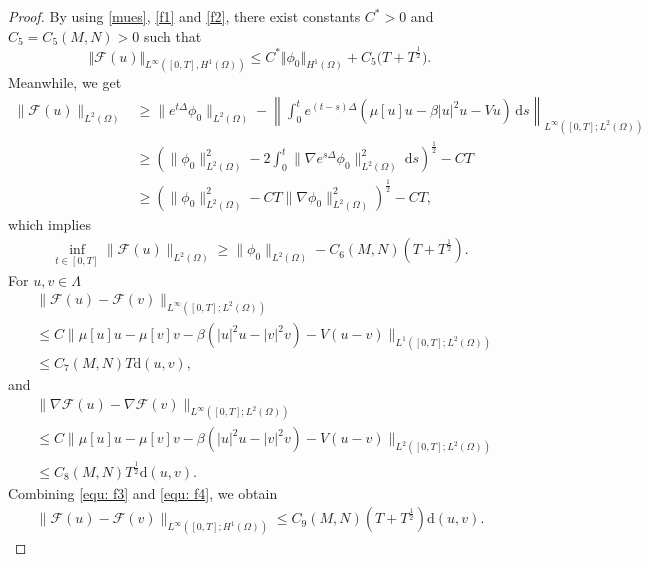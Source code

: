 \documentclass{siamart250211}
\def\nn{\nonumber}
\begin{document}
\begin{proof}
By using \eqref{mues}, \eqref{f1} and \eqref{f2}, there exist  constants $C^* > 0$ and $C_5 = C_5(M,N)>0$  such that
 \begin{equation}\label{equ: f5}
    \Vert \mathcal{F}(u)\Vert_{ L^\infty([0,T],H^1(\Omega))}\leq C^*\Vert \phi_0\Vert_{H^1(\Omega)}+C_5\Big(T+T^{\frac{1}{2}}\Big).
\end{equation}
Meanwhile, we get 
\begin{align}
    \|\mathcal{F}(u)\|_{L^2(\Omega)}& \ge \|e^{t\Delta}\phi_0\|_{L^2(\Omega)} - \left\|\int_0^te^{(t-s)\Delta}(\mu[u]u-\beta|u|^{2}u-Vu) \, \text{d}s \right\|_{L^{\infty}([0,T];L^2(\Omega))} \\
    & \ge \left(\|\phi_0\|_{L^2(\Omega)}^2 - 2\int_0^t \|\nabla e^{s\Delta}\phi_0\|_{L^2(\Omega)}^2 \ \text{d}s  \right)^{\frac12} - CT \nn \\
    &\ge  \left(\|\phi_0\|_{L^2(\Omega)}^2 - C T \|\nabla \phi_0\|_{L^2(\Omega)}^2  \right)^{\frac12} - CT, \nn
\end{align}
which implies 
\begin{align}\label{equ: f6}
    \inf_{t \in [0,T]} \|\mathcal{F}(u)\|_{L^2(\Omega)} \ge \|\phi_0\|_{L^2(\Omega)} - C_6(M,N)(T + T^{\frac12}).
\end{align}
For $u,v \in \Lambda$ 
\begin{align}
    & \|\mathcal{F}(u) - \mathcal{F}(v)\|_{L^\infty([0,T];L^2(\Omega))} \label{equ: f3}\\
    & \le C \| \mu[u]u - \mu[v]v-\beta(|u|^{2}u - |v|^{2}v)-V(u -v)\|_{L^{1}([0,T];L^2(\Omega))} \nn \\
    & \le C_7(M,N) T \text{d}(u,v), \nn
\end{align}
and 
\begin{align}
    & \|\nabla\mathcal{F}(u) - \nabla\mathcal{F}(v)\|_{L^\infty([0,T];L^2(\Omega))} \label{equ: f4}  \\
    & \le C \| \mu[u]u - \mu[v]v-\beta(|u|^{2}u - |v|^{2}v)-V(u -v)\|_{L^{2}([0,T];L^2(\Omega))} \nn \\
    & \le C_8(M,N) T^{\frac12} \text{d}(u,v). \nn
\end{align}
Combining \eqref{equ: f3} and \eqref{equ: f4}, we obtain
\begin{align}\label{equ: f7}
    \|\mathcal{F}(u) - \mathcal{F}(v)\|_{L^\infty([0,T];H^1(\Omega))} \le C_9(M,N)(T + T^{\frac12}) \text{d}(u,v).
\end{align}


\end{proof}
\end{document}
